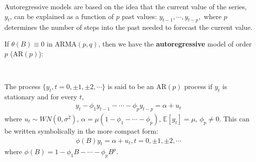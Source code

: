 Autoregressive models are based on the idea that the current value of the series,
$y_t$, can be explained as a function of $p$ past values: $y_{t-1}, \cdots, y_{t-p},$
where $p$ determines the number of steps into the past needed to forecast the current value.

If $\theta(B) \equiv 0$ in ARMA$(p,q)$, then we have the \textbf{autoregressive} model of order $p$ (AR$(p)$):
\begin{definition}[AR$(p)$ Process]\label{def:ARp}
    \
    
    The process $\{ y_t, t=0, \pm1, \pm2, \cdots\}$ is said to be an AR$(p)$ process if $y_t$ is stationary and for every $t$,
    \begin{gather}\label{eq:ARp}
        y_t - \phi_1 y_{t-1} - \cdots - \phi_p y_{t-p} = \alpha + u_t
    \end{gather}
    where $u_t \sim WN(0,\sigma^2)$, $\alpha = \mu \left( 1-\phi_1 - \cdots - \phi_p \right)$, $\mathbb{E}[y_t] = \mu$, $\phi_p \neq 0.$
    This can be written symbolically in the more compact form:
    \begin{gather*}
        \phi (B) y_t = \alpha + u_t, t = 0, \pm1, \pm2, \cdots
    \end{gather*}
    where $\phi (B) = 1 - \phi_1 B - \cdots - \phi_p B^p$.
\end{definition}


